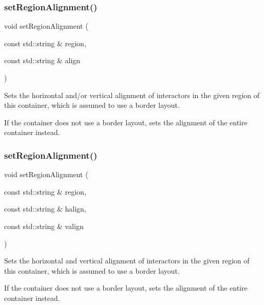 \subsubsection{\texorpdfstring{set\+Region\+Alignment()}{setRegionAlignment()}\hspace{0.1cm}{\footnotesize\ttfamily [4/5]}}
{\footnotesize\ttfamily void set\+Region\+Alignment (\begin{DoxyParamCaption}\item[{const std\+::string \&}]{region,  }\item[{const std\+::string \&}]{align }\end{DoxyParamCaption})\hspace{0.3cm}{\ttfamily [virtual]}}



Sets the horizontal and/or vertical alignment of interactors in the given region of this container, which is assumed to use a border layout. 

If the container does not use a border layout, sets the alignment of the entire container instead. \mbox{\label{classGContainer_ad1c76be81b3b865f78b0e91f0e1f07d4}} 
\subsubsection{\texorpdfstring{set\+Region\+Alignment()}{setRegionAlignment()}\hspace{0.1cm}{\footnotesize\ttfamily [5/5]}}
{\footnotesize\ttfamily void set\+Region\+Alignment (\begin{DoxyParamCaption}\item[{const std\+::string \&}]{region,  }\item[{const std\+::string \&}]{halign,  }\item[{const std\+::string \&}]{valign }\end{DoxyParamCaption})\hspace{0.3cm}{\ttfamily [virtual]}}



Sets the horizontal and vertical alignment of interactors in the given region of this container, which is assumed to use a border layout. 

If the container does not use a border layout, sets the alignment of the entire container instead. \mbox{\label{classGContainer_aca8f01ef261afca9c843589e8be54134}} 
